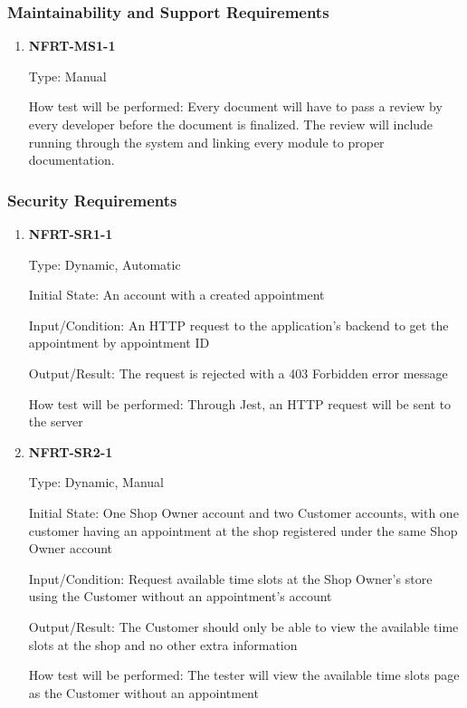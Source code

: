 \documentclass[12pt, titlepage]{article}
\begin{document}
\subsubsection{Maintainability and Support Requirements}
\begin{enumerate}
	\item \textbf{NFRT-MS1-1} %

	      Type: Manual

	      How test will be performed: Every document will have to pass a review by every developer before the
	      document is finalized. The review will include running through the system and linking every module
	      to proper documentation.

\end{enumerate}

\subsubsection{Security Requirements}
\begin{enumerate}

	\item \textbf{NFRT-SR1-1}

	      Type: Dynamic, Automatic

	      Initial State: An account with a created appointment

	      Input/Condition: An HTTP request to the application's backend to get the appointment by appointment
	      ID

	      Output/Result: The request is rejected with a 403 Forbidden error message

	      How test will be performed: Through Jest, an HTTP request will be sent to the server

	\item \textbf{NFRT-SR2-1}

	      Type: Dynamic, Manual

	      Initial State: One Shop Owner account and two Customer accounts, with one customer having an
	      appointment at the shop registered under the same Shop Owner account

	      Input/Condition: Request available time slots at the Shop Owner's store using the Customer without
	      an appointment's account

	      Output/Result: The Customer should only be able to view the available time slots at the shop and no
	      other extra information

	      How test will be performed: The tester will view the available time slots page as the Customer
	      without an appointment

\end{enumerate}
\end{document}
